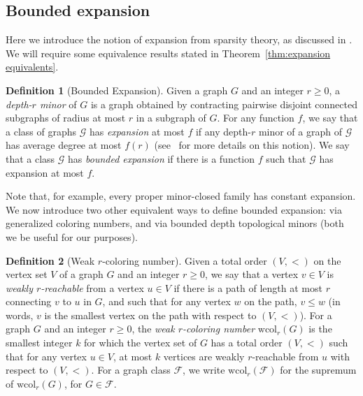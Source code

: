 \documentclass[11pt]{article}
\theoremstyle{definition}
\newtheorem{definition}{Definition}
\newcommand{\wcol}{\mathrm{wcol}}
\renewcommand{\le}{\leqslant}
\renewcommand{\ge}{\geqslant}
\begin{document}
\subsection{Bounded expansion}
\label{section:bounded-expansion}

Here we introduce the notion of expansion from sparsity theory, as
discussed in \cite[Chapter 5]{NO12}. We will require some
equivalence results stated in Theorem~\ref{thm:expansion equivalents}.

\begin{definition}[Bounded Expansion]\label{def:boundedexp}
Given a graph $G$ and an integer $r\ge 0$, a \emph{depth-$r$ minor} of $G$ is a graph obtained by
contracting pairwise disjoint  connected subgraphs of radius at most $r$ in a subgraph of $G$.  For
any function $f$, we say that a class of graphs $\mathcal{G}$ has \emph{expansion} at most $f$ if
any depth-$r$ minor of a graph of $\mathcal{G}$ has average degree at
most $f(r)$ (see~\cite[Section 5.5]{NO12}
for more details on this notion).  We say that a class $\mathcal{G}$ has \emph{bounded expansion} if
there is a function $f$ such that $\mathcal{G}$  has expansion at most $f$.
\end{definition}

Note that, for example, every proper minor-closed family has constant
expansion. We now introduce two other equivalent ways to define bounded
expansion:   via generalized coloring numbers, and via bounded depth
topological minors (both we be useful for our purposes). 

\begin{definition}[Weak $r$-coloring number]
\label{def:weak reachability}
Given a total order $(V,<)$ on the vertex set $V$ of a graph $G$ and
an integer $r\ge 0$, we
say that a vertex  $v\in V$ is \emph{weakly $r$-reachable} from a vertex
$u\in V$ if there is a path of length at most $r$ connecting $v$ to
$u$ in $G$, and such that for any vertex $w$ on the path, $v\le w$ (in
words, $v$ is the smallest vertex on the path with respect to
$(V,<)$). For a graph $G$ and an integer $r\ge 0$, the \emph{weak
  $r$-coloring number}
$\wcol_r(G)$ is the smallest integer $k$ for which the vertex set of $G$ has a total order $(V,<)$ such
that for any vertex $u\in V$, at most $k$ vertices are weakly $r$-reachable
from $u$ with respect to $(V,<)$. For a graph class $\mathcal{F}$, we
write $\wcol_r(\mathcal{F})$ for the supremum of $\wcol_r(G)$, for $G \in \mathcal{F}$.
\end{definition}
\end{document}
